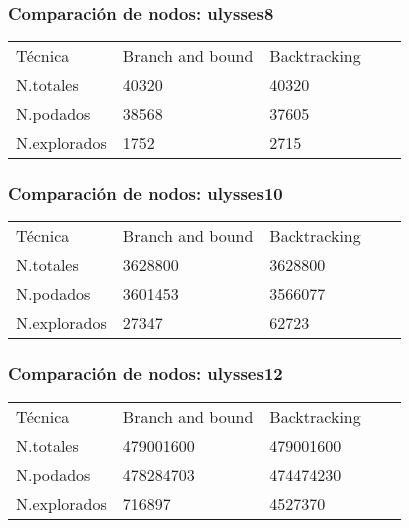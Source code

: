 \documentclass{beamer}
\begin{document}
\begin{frame}
	\frametitle{Comparación de nodos: ulysses8}
	
	\begin{table}[]
		\centering
		
		\label{my-label}
		\begin{tabular}{lllll}
			Técnica	& Branch and bound & Backtracking  &   \\
			N.totales& 40320&40320  &  &  \\
			N.podados&  38568& 37605 &  &  \\
			N.explorados&1752  &2715 &  &  \\
			
		\end{tabular}
	\end{table}
	
\end{frame}


\begin{frame}
	\frametitle{Comparación de nodos: ulysses10}
	
	\begin{table}[]
		\centering
		
		\label{my-label}
		\begin{tabular}{lllll}
			Técnica	& Branch and bound & Backtracking  &   \\
			N.totales& 3628800&3628800  &  &  \\
			N.podados&  3601453& 3566077 &  &  \\
			N.explorados&27347  &62723  &  &  \\
			
		\end{tabular}
	\end{table}
	
\end{frame}


\begin{frame}
	\frametitle{Comparación de nodos: ulysses12}
	
	\begin{table}[]
		\centering
		
		\label{my-label}
		\begin{tabular}{lllll}
			Técnica	& Branch and bound & Backtracking  &   \\
			N.totales& 479001600&479001600 &  &  \\
			N.podados&  478284703& 474474230&  &  \\
			N.explorados&716897  &4527370  &  &  \\
			
		\end{tabular}
	\end{table}
	
\end{frame}
\end{document}
